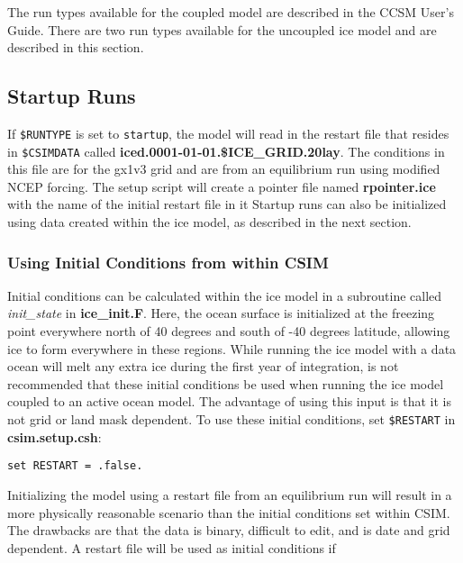 
The run types available for the coupled model are described in the CCSM
User's Guide. There are two run types available for the uncoupled ice
model and are described in this section.

\subsection{Startup Runs}

If {\tt \$RUNTYPE} is set to {\tt startup}, the model will read in the restart file
that resides in {\tt \$CSIMDATA} called {\bf iced.0001-01-01.\$ICE\_GRID.20lay}.
The conditions in this file are for the gx1v3 grid and are from an equilibrium run
using modified NCEP forcing.  The setup script will create a pointer file named 
{\bf rpointer.ice} with the name of the initial restart file in it Startup
runs can also be initialized using data created within the ice model, as
described in the next section.

\subsubsection*{Using Initial Conditions from within CSIM}
\label{model_generated}

Initial conditions can be calculated within the ice model in a subroutine
called {\it init\_state} in {\bf ice\_init.F}.  Here, the ocean surface is initialized
at the freezing point everywhere north of 40 degrees and south of -40 degrees
latitude,  allowing ice to form everywhere in these regions.
While running the ice model with a data ocean will melt any extra
ice during the first year of integration, is not recommended that these
initial conditions be used when running the ice model coupled to an
active ocean model.  The advantage of using this input is that it is not
grid or land mask dependent.  To use these initial conditions, set {\tt \$RESTART}
in {\bf csim.setup.csh}:

\begin{verbatim}
set RESTART = .false.
\end{verbatim}

Initializing the model using a restart file from an equilibrium run
will result in a more physically reasonable scenario than the initial
conditions set within CSIM. The drawbacks are that the data is
binary, difficult to edit, and is date and grid dependent.
A restart file will be used as initial conditions if

